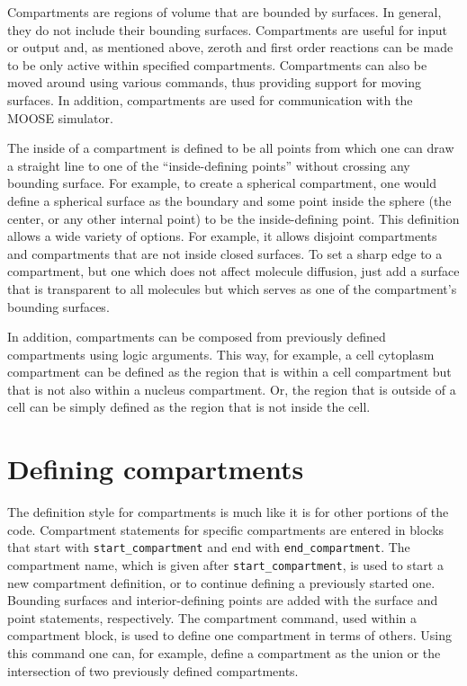 \documentclass {scrbook}
\newcommand {\ttt} {\texttt}
\begin{document}
Compartments are regions of volume that are bounded by surfaces. In general, they do not include their bounding surfaces. Compartments are useful for input or output and, as mentioned above, zeroth and first order reactions can be made to be only active within specified compartments. Compartments can also be moved around using various commands, thus providing support for moving surfaces. In addition, compartments are used for communication with the MOOSE simulator.

The inside of a compartment is defined to be all points from which one can draw a straight line to one of the ``inside-defining points'' without crossing any bounding surface. For example, to create a spherical compartment, one would define a spherical surface as the boundary and some point inside the sphere (the center, or any other internal point) to be the inside-defining point. This definition allows a wide variety of options. For example, it allows disjoint compartments and compartments that are not inside closed surfaces. To set a sharp edge to a compartment, but one which does not affect molecule diffusion, just add a surface that is transparent to all molecules but which serves as one of the compartment's bounding surfaces.

In addition, compartments can be composed from previously defined compartments using logic arguments. This way, for example, a cell cytoplasm compartment can be defined as the region that is within a cell compartment but that is not also within a nucleus compartment. Or, the region that is outside of a cell can be simply defined as the region that is not inside the cell.

\section{Defining compartments}

The definition style for compartments is much like it is for other portions of the code. Compartment statements for specific compartments are entered in blocks that start with \ttt{start\_compartment} and end with \ttt{end\_compartment}. The compartment name, which is given after \ttt{start\_compartment}, is used to start a new compartment definition, or to continue defining a previously started one. Bounding surfaces and interior-defining points are added with the surface and point statements, respectively. The compartment command, used within a compartment block, is used to define one compartment in terms of others. Using this command one can, for example, define a compartment as the union or the intersection of two previously defined compartments.
\end{document}
